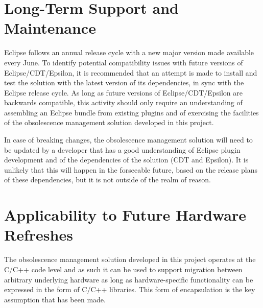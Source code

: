 \documentclass{llncs}
\begin{document}
\section{Long-Term Support and Maintenance}
Eclipse follows an annual release cycle with a new major version made available every June. To identify potential compatibility issues with future versions of Eclipse/CDT/Epsilon, it is recommended that an attempt is made to install and test the solution with the latest version of its dependencies, in sync with the Eclipse release cycle. As long as future versions of Eclipse/CDT/Epsilon are backwards compatible, this activity should only require an understanding of assembling an Eclipse bundle from existing plugins and of exercising the facilities of the obsolescence management solution developed in this project.

In case of breaking changes, the obsolescence management solution will need to be updated by a developer that has a good understanding of Eclipse plugin development and of the dependencies of the solution (CDT and Epsilon). It is unlikely that this will happen in the forseeable future, based on the release plans of these dependencies, but it is not outside of the realm of reason.

\section{Applicability to Future Hardware Refreshes}
The obsolescence management solution developed in this project operates at the C/C++ code level and as such it can be used to support migration between arbitrary underlying hardware as long as hardware-specific functionality can be expressed in the form of C/C++ libraries. This form of encapsulation is the key assumption that has been made. 




\renewcommand{\baselinestretch}{1.0}
\end{document}
